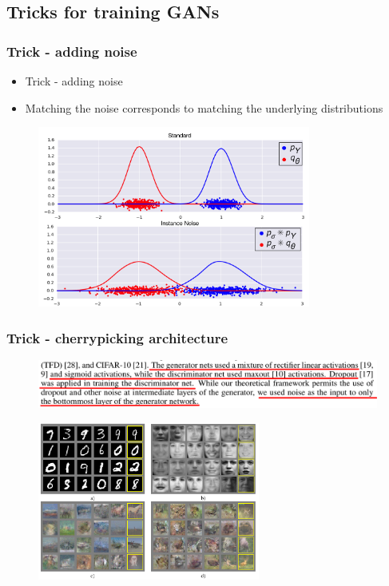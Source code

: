 \documentclass{Bredelebeamer}
\begin{document}
\subsection{Tricks for training GANs}
\begin{frame}
	\frametitle{Trick - adding noise}
	\begin{itemize}
		\item Trick - adding noise
		\item Matching the noise corresponds to matching the underlying distributions
	\end{itemize}
		\begin{figure}[h!]
			\centering
			\includegraphics[width=0.8\textwidth]{instance_noise.png}
		\end{figure}
\end{frame}
\begin{frame}
	\frametitle{Trick - cherrypicking architecture}
		\begin{figure}[h!]
			\centering
			\includegraphics[width=\textwidth]{original_GAN_guidelines.png}
		\end{figure}
		\pause
		\begin{figure}[h!]
			\centering
			\includegraphics[width=0.65\textwidth]{original_GAN_results.png}
		\end{figure}
\end{frame}
\end{document}
